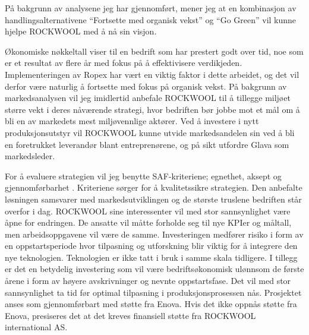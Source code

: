 På bakgrunn av analysene jeg har gjennomført, mener jeg at en kombinasjon av handlingsalternativene “Fortsette med organisk vekst” og “Go Green” vil kunne hjelpe ROCKWOOL med å nå sin visjon. 

\indent \newline
Økonomiske nøkkeltall viser til en bedrift som har prestert godt over tid, noe som er et resultat av flere år med fokus på å effektivisere verdikjeden. Implementeringen av Ropex har vært en viktig faktor i dette arbeidet, og det vil derfor være naturlig å fortsette med fokus på organisk vekst. På bakgrunn av markedsanalysen vil jeg imidlertid anbefale ROCKWOOL til å tillegge miljøet større vekt i deres nåværende strategi, hvor bedriften bør jobbe mot et mål om å bli en av markedets mest miljøvennlige aktører. Ved å investere i nytt produksjonsutstyr vil ROCKWOOL kunne utvide markedsandelen sin ved å bli en foretrukket leverandør blant entreprenørene, og på sikt utfordre Glava som markedsleder. 

\indent \newline
For å evaluere strategien vil jeg benytte SAF-kriteriene; egnethet, aksept og gjennomførbarhet \cite[s.~236-241]{FundamentalsOfStrategy}. Kriteriene sørger for å kvalitetssikre strategien. Den anbefalte løsningen samsvarer med markedsutviklingen og de største truslene bedriften står overfor i dag. ROCKWOOL sine interessenter vil med stor sannsynlighet være åpne for endringen. De ansatte vil måtte forholde seg til nye KPIer og måltall, men arbeidsoppgavene vil være de samme. Investeringen medfører risiko i form av en oppstartsperiode hvor tilpasning og utforskning blir viktig for å integrere den nye teknologien. Teknologien er ikke tatt i bruk i samme skala tidligere. I tillegg er det en betydelig investering som vil være bedriftsøkonomisk ulønnsom de første årene i form av høyere avskrivninger og nevnte oppstartsfase. Det vil med stor sannsynlighet ta tid før optimal tilpasning i produksjonsprosessen nås. Prosjektet anses som gjennomførbart med støtte fra Enova. Hvis det ikke oppnås støtte fra Enova, presiseres det at det kreves finansiell støtte fra ROCKWOOL international AS.